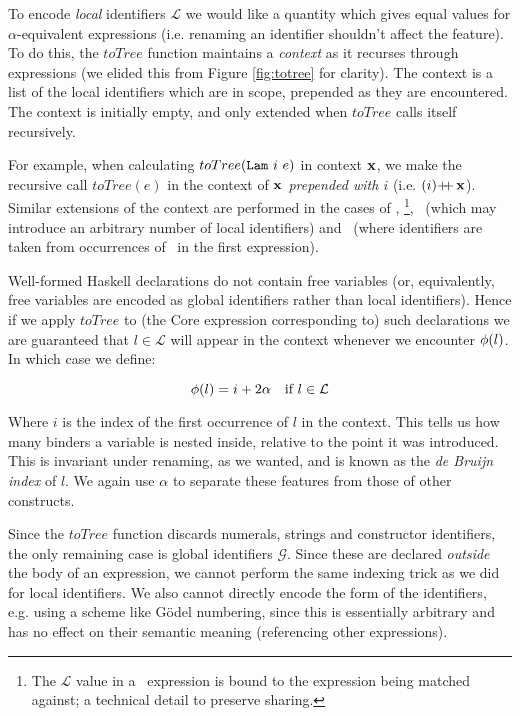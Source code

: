 To encode \emph{local} identifiers $\mathcal{L}$ we would like a quantity which gives equal values for $\alpha$-equivalent expressions (i.e. renaming an identifier shouldn't affect the feature). To do this, the $toTree$ function maintains a \emph{context} as it recurses through expressions (we elided this from Figure \ref{fig:totree} for clarity). The context is a list of the local identifiers which are in scope, prepended as they are encountered. The context is initially empty, and only extended when $toTree$ calls itself recursively.

For example, when calculating $toTree(\texttt{Lam}\ i\ e)$ in context $\mathbf{x}$, we make the recursive call $toTree(e)$ in the context of \emph{$\mathbf{x}$ prepended with $i$} (i.e. $(i) \mbox{\ensuremath{+\!\!+\,}} \mathbf{x}$). Similar extensions of the context are performed in the cases of \CBind, \CCase\footnote{The $\mathcal{L}$ value in a \CCase\ expression is bound to the expression being matched against; a technical detail to preserve sharing.}, \CAlt\ (which may introduce an arbitrary number of local identifiers) and \CLet\ (where identifiers are taken from occurrences of \CBind\ in the first expression).

Well-formed Haskell declarations do not contain free variables (or, equivalently, free variables are encoded as global identifiers rather than local identifiers). Hence if we apply $toTree$ to (the Core expression corresponding to) such declarations we are guaranteed that $l \in \mathcal{L}$ will appear in the context whenever we encounter $\phi(l)$. In which case we define:

\begin{equation} \label{eq:localfeature}
  \phi(l) = i + 2 \alpha \quad \text{if $l \in \mathcal{L}$}
\end{equation}

Where $i$ is the index of the first occurrence of $l$ in the context. This tells us how many binders a variable is nested inside, relative to the point it was introduced. This is invariant under renaming, as we wanted, and is known as the \emph{de Bruijn index} of $l$. We again use $\alpha$ to separate these features from those of other constructs.

Since the $toTree$ function discards numerals, strings and constructor identifiers, the only remaining case is global identifiers $\mathcal{G}$. Since these are declared \emph{outside} the body of an expression, we cannot perform the same indexing trick as we did for local identifiers. We also cannot directly encode the form of the identifiers, e.g. using a scheme like G{\"o}del numbering, since this is essentially arbitrary and has no effect on their semantic meaning (referencing other expressions).

